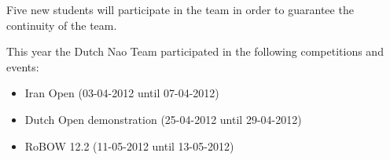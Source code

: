 \documentclass[11pt]{article}
\begin{document}
Five new students will participate in the team in order to guarantee the continuity of the team. 
\begin{comment}
The current team consists of the following persons:
\begin{description}
\item[Supervisor:] Dr. Arnoud Visser
\item[Coordinator:] Duncan ten Velthuis
\item[Vice Coordinators:] Camiel Verschoor and Auke Wiggers
\item[Senior Students:] Michael Cabot, Anna Keune, Sander Nugteren, Hendrik van Egmond, Tim van Rossum, Hessel van der Molen, Richard Rozeboom
\item[Students:] Inge Becht, Maarten de Jonge, Richard Pronk, Chiel Kooijman and Roman Slaap
\end{description}
\end{comment}
This year the Dutch Nao Team participated in the following competitions and events:
\begin{itemize}
\item Iran Open (03-04-2012 until 07-04-2012)
\item Dutch Open demonstration (25-04-2012 until 29-04-2012)
\item RoBOW 12.2 (11-05-2012 until 13-05-2012)
\end{itemize}
\begin{comment}
Next to participating in competitions, the Dutch Nao Team will also be active at the Dutch Open in Eindhoven (25-04-2012 until 29-04-2012) with the following activities:
\begin{itemize}
\item SPL demonstration
\item Dutch Nao Users Day (workshop organized by Aldebaran)
\item RoboCup Junior 
\end{itemize}
\end{comment}
\end{document}

